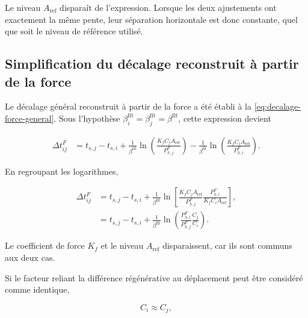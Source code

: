 \documentclass[
    11pt,
    a4paper
]{article}
\begin{document}
Le niveau \(A_{\mathrm{ref}}\) disparaît de l’expression. Lorsque les deux
ajustements ont exactement la même pente, leur séparation horizontale est donc
constante, quel que soit le niveau de référence utilisé.

\subsection{Simplification du décalage reconstruit à partir de la force}
\label{subsec:simplification-dt-force-beta-identiques}

Le décalage général reconstruit à partir de la force a été établi à la
\ref{eq:decalage-force-general}. Sous l’hypothèse
\(\beta_i^{\mathrm{fit}}=\beta_j^{\mathrm{fit}}
=\beta^{\mathrm{fit}}\), cette expression devient

\begin{align}
    \Delta t_{ij}^{F}
    &=
    t_{s,j}-t_{s,i} +
    \frac{1}{\beta^{\mathrm{fit}}}
    \ln\left(
        \frac{K_f C_j A_{\mathrm{ref}}}
        {P_{h,j}^{F}}
    \right)
    -
    \frac{1}{\beta^{\mathrm{fit}}}
    \ln\left(
        \frac{K_f C_i A_{\mathrm{ref}}}
        {P_{h,i}^{F}}
    \right).
    \label{eq:dt-force-beta-identiques-intermediaire}
\end{align}

En regroupant les logarithmes,

\begin{align}
    \Delta t_{ij}^{F}
    &=
    t_{s,j}-t_{s,i}
    +
    \frac{1}{\beta^{\mathrm{fit}}}
    \ln\left[
        \frac{
            K_f C_j A_{\mathrm{ref}}
        }{
            P_{h,j}^{F}
        }
        \frac{
            P_{h,i}^{F}
        }{
            K_f C_i A_{\mathrm{ref}}
        }
    \right],
    \nonumber\\
    &=
    t_{s,j}-t_{s,i}
    +
    \frac{1}{\beta^{\mathrm{fit}}}
    \ln\left(
        \frac{P_{h,i}^{F}}{P_{h,j}^{F}}
        \frac{C_j}{C_i}
    \right).
    \label{eq:dt-force-beta-identiques-general}
\end{align}

Le coefficient de force \(K_f\) et le niveau \(A_{\mathrm{ref}}\) disparaissent,
car ils sont communs aux deux cas.

Si le facteur reliant la différence régénérative au déplacement peut être
considéré comme identique,

\begin{equation}
    C_i \approx C_j,
    \label{eq:hypothese-C-identiques}
\end{equation}
\end{document}
